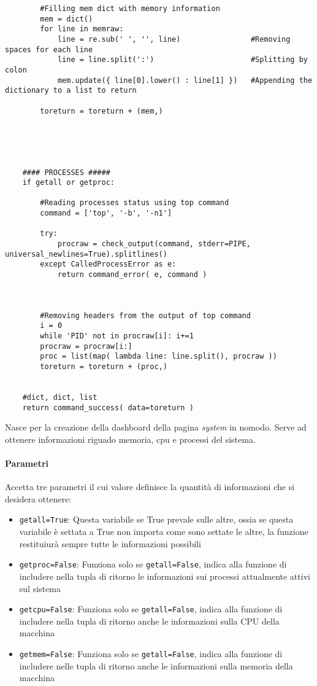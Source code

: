 \documentclass[11pt]{article}
\begin{document}
\begin{lstlisting}
        #Filling mem dict with memory information
        mem = dict()
        for line in memraw:
            line = re.sub(' ', '', line)                #Removing spaces for each line
            line = line.split(':')                      #Splitting by colon
            mem.update({ line[0].lower() : line[1] })   #Appending the dictionary to a list to return

        toreturn = toreturn + (mem,)
    




    #### PROCESSES #####
    if getall or getproc:

        #Reading processes status using top command
        command = ['top', '-b', '-n1']

        try:
            procraw = check_output(command, stderr=PIPE, universal_newlines=True).splitlines()
        except CalledProcessError as e:
            return command_error( e, command )



        #Removing headers from the output of top command
        i = 0
        while 'PID' not in procraw[i]: i+=1
        procraw = procraw[i:]
        proc = list(map( lambda line: line.split(), procraw ))
        toreturn = toreturn + (proc,)


    #dict, dict, list
    return command_success( data=toreturn )
\end{lstlisting}
Nasce per la creazione della dashboard della pagina \textit{system} in nomodo. Serve ad ottenere informazioni
riguado memoria, cpu e processi del sistema.
\paragraph{Parametri}
Accetta tre parametri il cui valore definisce la quantità di informazioni che si desidera ottenere:
\begin{itemize}
	\item{\texttt{getall=True}: Questa variabile se True prevale sulle altre, ossia se questa variabile è settata a True
		non importa come sono settate le altre, la funzione restituiurà sempre tutte le informazioni possibili}
	\item{\texttt{getproc=False}: Funziona solo se \texttt{getall=False}, indica alla funzione di includere
		nella tupla di ritorno le informazioni sui processi attualmente attivi sul sistema}
	\item{\texttt{getcpu=False}: Funziona solo se \texttt{getall=False}, indica alla funzione di includere
		nella tupla di ritorno anche le informazioni sulla CPU della macchina}
	\item{\texttt{getmem=False}: Funziona solo se \texttt{getall=False}, indica alla funzione di includere
		nelle tupla di ritorno anche le informazioni sulla memoria della macchina}
\end{itemize}
\end{document}
